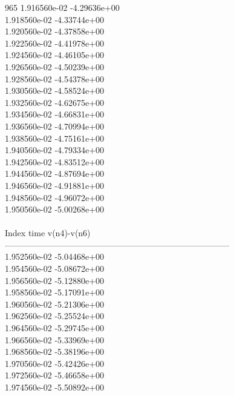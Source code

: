965	1.916560e-02	-4.29636e+00	\\ 	1.918560e-02	-4.33744e+00	\\ 	1.920560e-02	-4.37858e+00	\\ 	1.922560e-02	-4.41978e+00	\\ 	1.924560e-02	-4.46105e+00	\\ 	1.926560e-02	-4.50239e+00	\\ 	1.928560e-02	-4.54378e+00	\\ 	1.930560e-02	-4.58524e+00	\\ 	1.932560e-02	-4.62675e+00	\\ 	1.934560e-02	-4.66831e+00	\\ 	1.936560e-02	-4.70994e+00	\\ 	1.938560e-02	-4.75161e+00	\\ 	1.940560e-02	-4.79334e+00	\\ 	1.942560e-02	-4.83512e+00	\\ 	1.944560e-02	-4.87694e+00	\\ 	1.946560e-02	-4.91881e+00	\\ 	1.948560e-02	-4.96072e+00	\\ 	1.950560e-02	-5.00268e+00	\\ \hline
\\ \hline
Index   time            v(n4)-v(n6)     \\ \hline
--------------------------------------------------------------------------------\\ 	1.952560e-02	-5.04468e+00	\\ 	1.954560e-02	-5.08672e+00	\\ 	1.956560e-02	-5.12880e+00	\\ 	1.958560e-02	-5.17091e+00	\\ 	1.960560e-02	-5.21306e+00	\\ 	1.962560e-02	-5.25524e+00	\\ 	1.964560e-02	-5.29745e+00	\\ 	1.966560e-02	-5.33969e+00	\\ 	1.968560e-02	-5.38196e+00	\\ 	1.970560e-02	-5.42426e+00	\\ 	1.972560e-02	-5.46658e+00	\\ 	1.974560e-02	-5.50892e+00	\\ \hline
